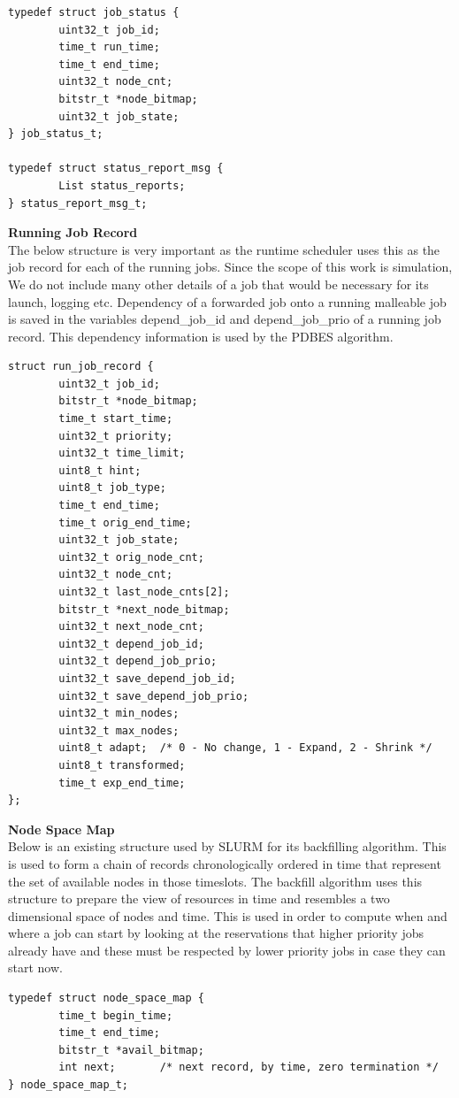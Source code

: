 \begin{lstlisting}[mathescape]
typedef struct job_status {
        uint32_t job_id;
        time_t run_time;
        time_t end_time;
        uint32_t node_cnt;
        bitstr_t *node_bitmap;
        uint32_t job_state;
} job_status_t;

typedef struct status_report_msg {
        List status_reports;
} status_report_msg_t;
\end{lstlisting}
\textbf{Running Job Record}\\
The below structure is very important as the runtime scheduler uses this as the job record for each of the running jobs. Since the scope of this work is simulation, We do not include many other details of a job that would be necessary for its launch, logging etc. Dependency of a forwarded job onto a running malleable job is saved in the variables depend\_job\_id and depend\_job\_prio of a running job record. This dependency information is used by the PDBES algorithm.
\begin{lstlisting}[mathescape]
struct run_job_record {
        uint32_t job_id;
        bitstr_t *node_bitmap;
        time_t start_time;
        uint32_t priority;
        uint32_t time_limit;
        uint8_t hint;
        uint8_t job_type;
        time_t end_time;
        time_t orig_end_time;
        uint32_t job_state;
        uint32_t orig_node_cnt;
        uint32_t node_cnt;
        uint32_t last_node_cnts[2];
        bitstr_t *next_node_bitmap;
        uint32_t next_node_cnt;
        uint32_t depend_job_id;
        uint32_t depend_job_prio;
        uint32_t save_depend_job_id;
        uint32_t save_depend_job_prio;
        uint32_t min_nodes;
        uint32_t max_nodes;
        uint8_t adapt;  /* 0 - No change, 1 - Expand, 2 - Shrink */
        uint8_t transformed;
        time_t exp_end_time;
};
\end{lstlisting}
\textbf{Node Space Map}\\
Below is an existing structure used by SLURM for its backfilling algorithm. This is used to form a chain of records chronologically ordered in time that represent the set of available nodes in those timeslots. The backfill algorithm uses this structure to prepare the view of resources in time and resembles a two dimensional space of nodes and time. This is used in order to compute when and where a job can start by looking at the reservations that higher priority jobs already have and these must be respected by lower priority jobs in case they can start now.
\begin{lstlisting}[mathescape]
typedef struct node_space_map {
        time_t begin_time;
        time_t end_time;
        bitstr_t *avail_bitmap;
        int next;       /* next record, by time, zero termination */
} node_space_map_t;
\end{lstlisting}
